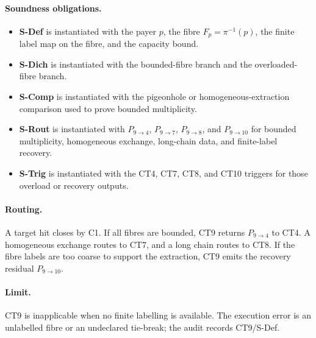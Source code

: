 \documentclass[
  11pt,
]{article}
\providecommand{\tightlist}{%
  \setlength{\itemsep}{0pt}\setlength{\parskip}{0pt}}
\theoremstyle{definition}
\newcommand{\ctpar}[1]{\paragraph{#1.}}
\begin{document}
\ctpar{Soundness obligations}
\begin{itemize}
\tightlist
\item \textbf{S-Def} is instantiated with the payer \(p\), the fibre \(F_p=\pi^{-1}(p)\), the finite label map on the fibre, and the capacity bound.
\item \textbf{S-Dich} is instantiated with the bounded-fibre branch and the overloaded-fibre branch.
\item \textbf{S-Comp} is instantiated with the pigeonhole or homogeneous-extraction comparison used to prove bounded multiplicity.
\item \textbf{S-Rout} is instantiated with \(P_{9\to4}\), \(P_{9\to7}\), \(P_{9\to8}\), and \(P_{9\to10}\) for bounded multiplicity, homogeneous exchange, long-chain data, and finite-label recovery.
\item \textbf{S-Trig} is instantiated with the CT4, CT7, CT8, and CT10 triggers for those overload or recovery outputs.
\end{itemize}

\ctpar{Routing}
A target hit closes by C1.  If all fibres are bounded, CT9 returns
\(P_{9\to4}\) to CT4.  A homogeneous exchange routes to CT7, and a long
chain routes to CT8.  If the fibre labels are too coarse to support the
extraction, CT9 emits the recovery residual \(P_{9\to10}\).

\ctpar{Limit}
CT9 is inapplicable when no finite labelling is available. The execution error
is an unlabelled fibre or an undeclared tie-break; the audit records
CT9/S-Def.
\end{document}
